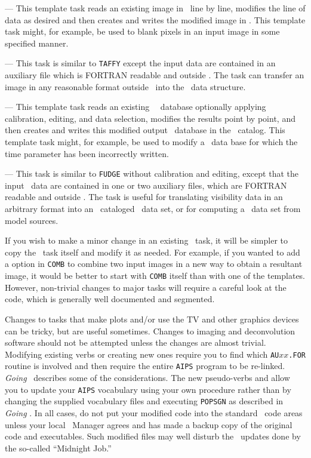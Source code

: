 {\tt {}} ---  This template task reads an existing image in
\AIPS\ line by line, modifies the line of data as desired and then
creates and writes the modified image in \hbox{\AIPS}.  This template
task might, for example, be used to blank pixels in an input image in
some specified manner.

{\tt {}} ---  This task is similar to {\tt TAFFY} except the
input data are contained in an auxiliary file which is FORTRAN
readable and outside \hbox{\AIPS}.  The task can transfer an image in
any reasonable format outside \AIPS\ into the \AIPS\ data structure.

{\tt {}} --- This template task reads an existing \AIPS\
\uv\ database optionally applying calibration, editing, and data
selection, modifies the results point by point, and then creates
and writes this modified output \uv\ database in the \AIPS\ catalog.
This template task might, for example, be used to modify a \uv\ data
base for which the time parameter has been incorrectly written.

{\tt {}} --- This task is similar to {\tt FUDGE} without
calibration and editing, except that the input \uv\ data are contained
in one or two auxiliary files, which are FORTRAN readable and outside
\AIPS\@.  The task is useful for translating visibility data in an
arbitrary format into an \AIPS\ cataloged \uv\ data set, or for
computing a \uv\ data set from model sources.

     If you wish to make a minor change in an existing \AIPS\ task, it
will be simpler to copy the \AIPS\ task itself and modify it as
needed.  For example, if you wanted to add a option in {\tt COMB} to
combine two input images in a new way to obtain a resultant image, it
would be better to start with {\tt COMB} itself than with one of the
templates.  However, non-trivial changes to major tasks will require a
careful look at the code, which is generally well documented and
segmented.

     Changes to tasks that make plots and/or use the TV and other
graphics devices can be tricky, but are useful sometimes.  Changes to
imaging and deconvolution software should not be attempted unless
the changes are almost trivial.  Modifying existing verbs or creating
new ones require you to find which {\tt AU$xx$.FOR} routine is
involved and then require the entire {\tt AIPS} program to be
re-linked.  {\it Going\/} \AIPS\ describes some of the considerations.
The new pseudo-verbs {\tt \tndx{VERB}} and {\tt \tndx{PSEUDOVB}} allow
you to update your {\tt AIPS} vocabulary using your own procedure
rather than by changing the supplied vocabulary files and executing
{\tt POPSGN} as described in {\it Going\/} \hbox{\AIPS}.  In all cases,
do not put your modified code into the standard \AIPS\ code areas
unless your local \AIPS\ Manager agrees and has made a backup copy of
the original code and executables.\iodx{Going AIPS} Such modified
files may well disturb the \AIPS\ updates done by the so-called
``Midnight Job.''

